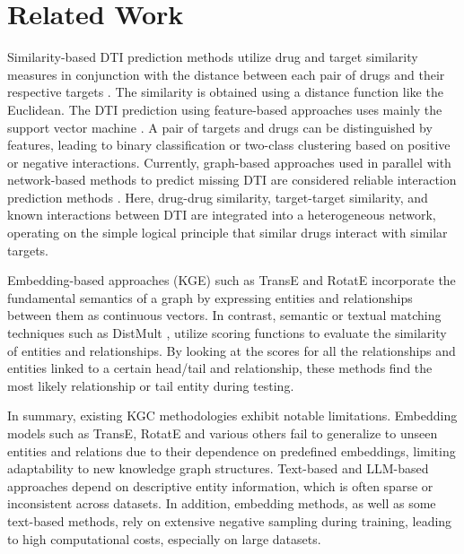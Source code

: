 \section{Related Work}
Similarity-based DTI prediction methods utilize drug and target similarity measures in conjunction with the distance between each pair of drugs and their respective targets \cite{shi2018drug}. The similarity is obtained using a distance function like the Euclidean.
The DTI prediction using feature-based approaches uses mainly the support vector machine \cite{zhang2017drugrpe}. A pair of targets and drugs can be distinguished by features, leading to binary classification or two-class clustering based on positive or negative interactions.
Currently, graph-based approaches used in parallel with network-based methods to predict missing DTI are considered reliable interaction prediction methods \cite{ban2019nrlmfbeta}. Here, drug-drug similarity, target-target similarity, and known interactions between DTI are integrated into a heterogeneous network, operating on the simple logical principle that similar drugs interact with similar targets.


Embedding-based approaches (KGE) such as TransE \cite{bordes2013translating} and RotatE \cite{sun2019rotate} incorporate the fundamental semantics of a graph by expressing entities and relationships between them as continuous vectors. In contrast, semantic or textual matching techniques such as DistMult \cite{yang2014embedding}, utilize scoring functions to evaluate the similarity of entities and relationships. By looking at the scores for all the relationships and entities linked to a certain head/tail and relationship, these methods find the most likely relationship or tail entity during testing. 

In summary, existing KGC methodologies exhibit notable limitations. Embedding models such as TransE, RotatE and various others fail to generalize to unseen entities and relations due to their dependence on predefined embeddings, limiting adaptability to new knowledge graph structures. Text-based and LLM-based approaches depend on descriptive entity information, which is often sparse or inconsistent across datasets. In addition, embedding methods, as well as some text-based methods, rely on extensive negative sampling during training, leading to high computational costs, especially on large datasets. 
%